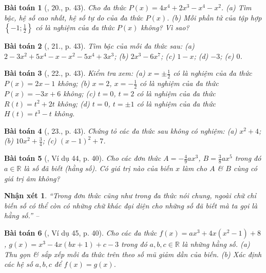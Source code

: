 \documentclass{article}
\newtheorem{baitoan}{Bài toán}
\newtheorem{nhanxet}{Nhận xét}
\begin{document}
\begin{baitoan}[\cite{SBT_Toan_7_Canh_Dieu_tap_2}, 20., p. 43]
	Cho đa thức $P(x) = 4x^4 + 2x^3 - x^4 - x^2$. (a) Tìm bậc, hệ số cao nhất, hệ số tự do của đa thức $P(x)$. (b) Mỗi phần tử của tập hợp $\left\{-1;\frac{1}{2}\right\}$ có là nghiệm của đa thức $P(x)$ không? Vì sao?
\end{baitoan}

\begin{baitoan}[\cite{SBT_Toan_7_Canh_Dieu_tap_2}, 21., p. 43]
	Tìm bậc của mỗi đa thức sau: (a) $2 - 3x^2 + 5x^4 - x - x^2 - 5x^4 + 3x^3$; (b) $2x^3 - 6x^7$; (c) $1 - x$; (d) $-3$; (e) $0$.
\end{baitoan}

\begin{baitoan}[\cite{SBT_Toan_7_Canh_Dieu_tap_2}, 22., p. 43]
	Kiểm tra xem: (a) $x = \pm\frac{1}{2}$ có là nghiệm của đa thức $P(x) = 2x - 1$ không; (b) $x = 2$, $x = -\frac{1}{2}$ có là nghiệm của đa thức $P(x) = -3x + 6$ không; (c) $t = 0$, $t = 2$ có là nghiệm của đa thức $R(t) = t^2 + 2t$ không; (d) $t = 0$, $t = \pm1$ có là nghiệm của đa thức $H(t) = t^3 - t$ không.
\end{baitoan}

\begin{baitoan}[\cite{SBT_Toan_7_Canh_Dieu_tap_2}, 23., p. 43]
	Chứng tỏ các đa thức sau không có nghiệm: (a) $x^2 + 4$; (b) $10x^2 + \frac{3}{4}$; (c) $(x - 1)^2 + 7$.
\end{baitoan}

\begin{baitoan}[\cite{Tuyen_Toan_7}, Ví dụ 44, p. 40]
	Cho các đơn thức $A = -\frac{4}{9}ax^3$, $B = \frac{3}{8}ax^5$ trong đó $a\in\mathbb{R}$ là số đã biết (hằng số). Có giá trị nào của biến $x$ làm cho $A$ \& $B$ cùng có giá trị âm không?
\end{baitoan}

\begin{nhanxet}
	``Trong đơn thức cũng như trong đa thức nói chung, ngoài chữ chỉ biến số có thể còn có những chữ khác đại diện cho những số đã biết mà ta gọi là \emph{hằng số}.'' -- \cite[p. 40]{Tuyen_Toan_7}
\end{nhanxet}

\begin{baitoan}[\cite{Tuyen_Toan_7}, Ví dụ 45, p. 40]
	Cho các đa thức $f(x) = ax^3 + 4x(x^2 - 1) + 8$, $g(x) = x^3 - 4x(bx + 1) + c - 3$ trong đó $a,b,c\in\mathbb{R}$ là những hằng số. (a) Thu gọn \& sắp xếp mỗi đa  thức trên theo số mũ giảm dần của biến. (b) Xác định các hệ số $a,b,c$ để $f(x) = g(x)$.
\end{baitoan}
\end{document}
